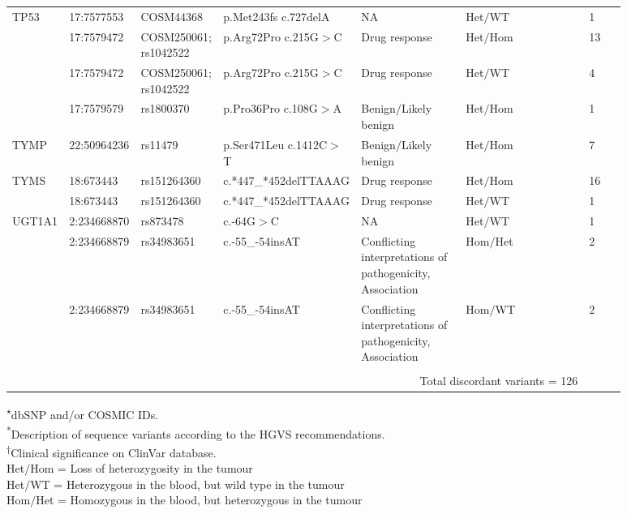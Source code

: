 \begin{landscape}
\begin{longtable}{p{0.09\linewidth}|p{0.1\linewidth}p{0.12\linewidth}p{0.14\linewidth}p{0.17\linewidth}p{0.2\linewidth}p{0.06\linewidth}}
		\hline
		TP53 & 17:7577553 & COSM44368 & p.Met243fs c.727delA & NA & Het$/$WT & 1
		\\
		& 17:7579472 & COSM250061; rs1042522 & p.Arg72Pro c.215G$>$C & Drug response & Het$/$Hom & 13
		\\
		& 17:7579472 & COSM250061; rs1042522 & p.Arg72Pro c.215G$>$C & Drug response & Het$/$WT & 4
		\\
		& 17:7579579 & rs1800370 & p.Pro36Pro c.108G$>$A & Benign$/$Likely benign & Het$/$Hom & 1
		\\
		\hline
		TYMP & 22:50964236 & rs11479 & p.Ser471Leu c.1412C$>$T & Benign$/$Likely benign & Het$/$Hom & 7
		\\
		\hline
		TYMS & 18:673443 & rs151264360 & \footnotesize{c.*447\_*452delTTAAAG} & Drug response & Het$/$Hom & 16
		\\
		& 18:673443 & rs151264360 & \footnotesize{c.*447\_*452delTTAAAG} & Drug response & Het$/$WT & 1
		\\
		\hline
		UGT1A1 & 2:234668870 & rs873478 & c.-64G$>$C & NA & Het$/$WT & 1
		\\
		& 2:234668879 & rs34983651 & c.-55\_-54insAT & Conflicting interpretations of pathogenicity, Association & Hom$/$Het & 2
		\\
		& 2:234668879 & rs34983651 & c.-55\_-54insAT & Conflicting interpretations of pathogenicity, Association & Hom$/$WT & 2
		\\
		\hline
		\\
		&
		\multicolumn{5}{r}{Total discordant variants = 126}
		&
		\\
		\hline
\end{longtable}

\noindent\textsuperscript{$\star$}dbSNP and/or COSMIC IDs.
\\
\textsuperscript{*}Description of sequence variants according to the HGVS recommendations.
\\
\textsuperscript{$\dagger$}Clinical significance on ClinVar database.
\\
Het$/$Hom = Loss of heterozygosity in the tumour
\\
Het$/$WT = Heterozygous in the blood, but wild type in the tumour
\\
Hom$/$Het = Homozygous in the blood, but heterozygous in the tumour

\end{landscape}

